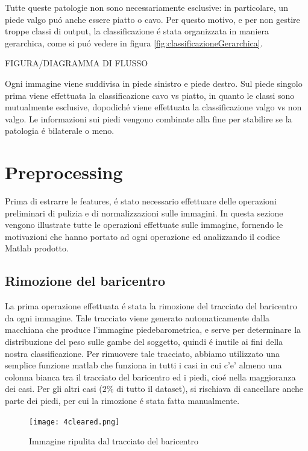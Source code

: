 \documentclass[11pt,twoside,a4paper]{article}
\begin{document}
Tutte queste patologie non sono necessariamente esclusive: in particolare, un piede valgo pu\'o anche essere piatto o cavo. Per questo motivo, e per non gestire troppe classi di output, la classificazione \'e stata organizzata in maniera gerarchica, come si pu\'o vedere in figura \ref{fig:classificazioneGerarchica}.

FIGURA/DIAGRAMMA DI FLUSSO

Ogni immagine viene suddivisa in piede sinistro e piede destro. Sul piede singolo prima viene effettuata la classificazione cavo vs piatto, in quanto le classi sono mutualmente esclusive, dopodich\'e viene effettuata la classificazione valgo vs non valgo. Le informazioni sui piedi vengono combinate alla fine per stabilire se la patologia \'e bilaterale o meno.

\section{Preprocessing}
\label{sec:preprocessing}
Prima di estrarre le features, \'e stato necessario effettuare delle operazioni preliminari di pulizia e di normalizzazioni sulle immagini. In questa sezione vengono illustrate tutte le operazioni effettuate sulle immagine, fornendo le motivazioni che hanno portato ad ogni operazione ed analizzando il codice Matlab prodotto.

\subsection{Rimozione del baricentro}
La prima operazione effettuata \'e stata la rimozione del tracciato del baricentro da ogni immagine. Tale tracciato viene generato automaticamente dalla macchiana che produce l'immagine piedebarometrica, e serve per determinare la distribuzione del peso sulle gambe del soggetto, quindi \'e inutile ai fini della nostra classificazione. Per rimuovere tale tracciato, abbiamo utilizzato una semplice funzione matlab che funziona in tutti i casi in cui c'e' almeno una colonna bianca tra il tracciato del baricentro ed i piedi, cio\'e nella maggioranza dei casi. Per gli altri casi ($2\%$ di tutto il dataset), si rischiava di cancellare anche parte dei piedi, per cui la rimozione \'e stata fatta manualmente.

\begin{figure}
\centering
\texttt{[image: 4cleared.png]}
\caption{Immagine ripulita dal tracciato del baricentro}
\end{figure}
\end{document}
